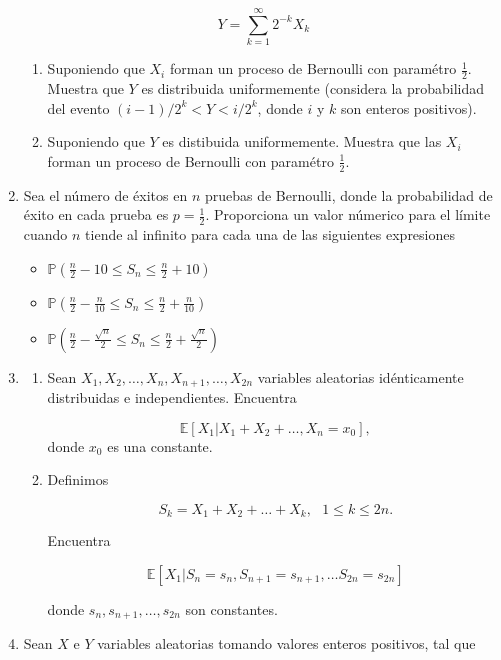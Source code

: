 \documentclass[a4paper,11pt]{report}
\newcommand{\PR}{\mathbb{P}}
\begin{document}
\begin{enumerate}
\[
Y = \sum_{k = 1}^{\infty}2^{-k}X_k
\]

\begin{enumerate}
	\item Suponiendo que $X_i$ forman un proceso de Bernoulli con param\'etro $\frac{1}{2}$. Muestra que $Y$ es \mbox{distribuida} uniformemente (considera la probabilidad del evento $(i - 1)/2^k < Y < i/2^k$, donde $i$ y $k$ son enteros positivos).
	\item Suponiendo que $Y$ es distibuida uniformemente. Muestra que las $X_i$ forman un proceso de \mbox{Bernoulli} con param\'etro $\frac{1}{2}$.
\end{enumerate}
\item  

Sea el n\'umero de \'exitos en $n$ pruebas de Bernoulli, donde la probabilidad de \'exito en cada prueba es $p = \frac{1}{2}$. Proporciona un valor n\'umerico para el l\'imite cuando $n$ tiende al infinito para cada una de las siguientes expresiones

\begin{itemize}
	\item $\PR(\frac{n}{2}- 10 \leq S_n \leq \frac{n}{2} +  10)$
	\item $\PR(\frac{n}{2} - \frac{n}{10} \leq S_n \leq \frac{n}{2} + \frac{n}{10} )$
	\item $\PR(\frac{n}{2} - \frac{\sqrt{n}}{2} \leq S_n \leq \frac{n}{2} + \frac{\sqrt{n}}{2} )$
\end{itemize}

\item 
\begin{enumerate}
	\item Sean $X_1, X_2, \dots, X_n, X_{n + 1}, \dots, X_{2n}$ variables aleatorias id\'enticamente distribuidas e \mbox{independientes}.
	Encuentra
	
	\[
	\mathbb{E}[X_1|X_1 + X_2 + \dots, X_n = x_0],
	\]
	donde $x_0$ es una constante.
	
	\item Definimos
	
	\[
	S_k = X_1 + X_2 + \dots + X_{k}, \ \ \  1 \leq k \leq 2n.
	\]
	
	Encuentra 
	
	\[
	\mathbb{E}[X_1| S_n = s_n, S_{n + 1} = s_{n + 1}, \dots S_{2n} = s_{2n}]
	\]
	
	donde $s_n, s_{n + 1}, \dots, s_{2n}$ son constantes.
\end{enumerate}

\item  Sean $X$ e $Y$ variables aleatorias tomando valores enteros positivos, tal que


\end{enumerate}
\end{document}
